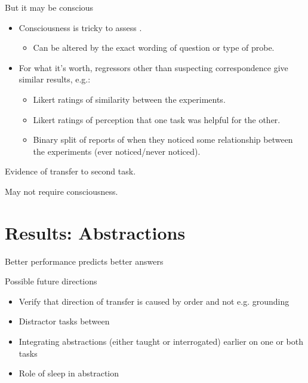 \documentclass{beamer}
\begin{document}
\begin{frame}{But it may be conscious}
\begin{itemize}
\item Consciousness is tricky to assess \citep{Newell2014}.
    \begin{itemize}
    \item<2-> Can be altered by the exact wording of question or type of probe.
    \end{itemize}
\item<3-> For what it's worth, regressors other than suspecting correspondence give similar results, e.g.:
    \begin{itemize}
    \item<4-> Likert ratings of similarity between the experiments.
    \item<5-> Likert ratings of perception that one task was helpful for the other. 
    \item<6-> Binary split of reports of when they noticed some relationship between the experiments (ever noticed/never noticed).
    \end{itemize}
\end{itemize}
\end{frame}

\begin{frame}[standout]
Evidence of transfer to second task. \par
{} {
May not require consciousness.
}
\end{frame}
\section{Results: Abstractions}

\begin{frame}{Better performance predicts better answers}
\begin{figure}
\centering
{}
\end{figure}
\end{frame}

\begin{frame}{Possible future directions}
\begin{itemize}
\item Verify that direction of transfer is caused by order and not e.g. grounding
\item Distractor tasks between
\item Integrating abstractions (either taught or interrogated) earlier on one or both tasks
\item Role of sleep in abstraction
\end{itemize}
\end{frame}
\end{document}
